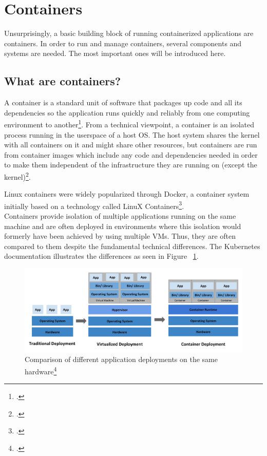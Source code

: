 \section{Containers}

Unsurprisingly, a basic building block of running containerized applications are containers.
In order to run and manage containers, several components and systems are needed. The most important ones will be introduced here.

\subsection{What are containers?}
A container is a standard unit of software that packages up code and all its dependencies so the application runs quickly and reliably from one computing environment to another\footcite[][, section 'Package Software into Standardized Units for Development, Shipment and Deployment']{whatContainer}.
From a technical viewpoint, a container is an isolated process running in the userspace of a host OS. The host system shares the kernel with all containers on it and might share other resources, but containers are run from container images which include any code and dependencies needed in order to make them independent of the infrastructure they are running on (except the kernel)\footcite[][, slide 13]{containerIntro}.

Linux containers were widely popularized through Docker, a container system initially based on a technology called LinuX Containers\footcite[][, section '2013: Docker']{containerHistory}.\\
Containers provide isolation of multiple applications running on the same machine and are often deployed in environments where this isolation would formerly have been achieved by using multiple VMs. Thus, they are often compared to them despite the fundamental technical differences. The Kubernetes documentation illustrates the differences as seen in Figure ~\ref{fig:VMsVsContainers}.

\begin{figure}[H]
\centering
\includegraphics[scale=0.3]{pictures/VMsVsContainers.jpg}
\caption{Comparison of different application deployments on the same hardware\protect\footcite[][, section 'Going back in time']{k8sBasics}}
\label{fig:VMsVsContainers}
\end{figure}

